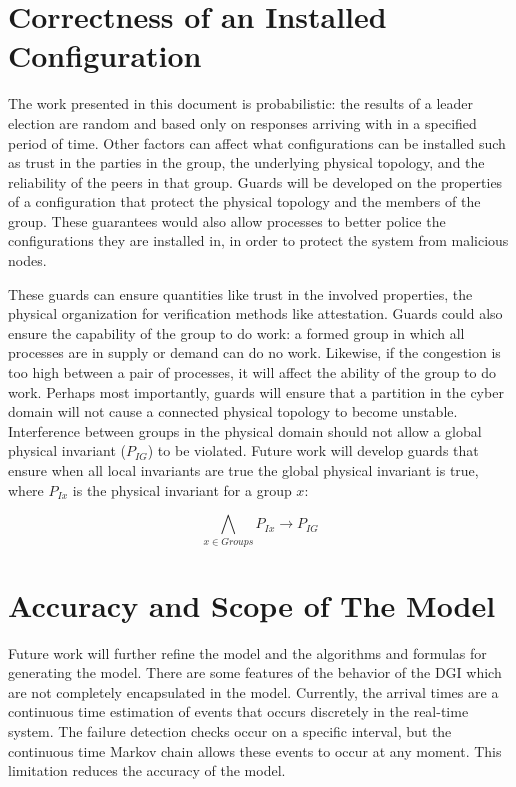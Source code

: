 \section{Correctness of an Installed Configuration}

The work presented in this document is probabilistic: the results of a leader election are random and based only on responses arriving with in a specified period of time.
Other factors can affect what configurations can be installed such as trust in the parties in the group, the underlying physical topology, and the reliability of the peers in that group.
Guards will be developed on the properties of a configuration that protect the physical topology and the members of the group.
These guarantees would also allow processes to better police the configurations they are installed in, in order to protect the system from malicious nodes.

These guards can ensure quantities like trust in the involved properties, the physical organization for verification methods like attestation.
Guards could also ensure the capability of the group to do work: a formed group in which all processes are in supply or demand can do no work.
Likewise, if the congestion is too high between a pair of processes, it will affect the ability of the group to do work.
Perhaps most importantly, guards will ensure that a partition in the cyber domain will not cause a connected physical topology to become unstable.
Interference between groups in the physical domain should not allow a global physical invariant ($P_{IG}$) to be violated.
Future work will develop guards that ensure when all local invariants are true the global physical invariant is true, where $P_{Ix}$ is the physical invariant for a group $x$:

\begin{equation}
\bigwedge_{x \in Groups}P_{Ix} \rightarrow P_{IG}
\end{equation}


\section{Accuracy and Scope of The Model}

Future work will further refine the model and the algorithms and formulas for generating the model.
There are some features of the behavior of the DGI which are not completely encapsulated in the model.
Currently, the arrival times are a continuous time estimation of events that occurs discretely in the real-time system.
The failure detection checks occur on a specific interval, but the continuous time Markov chain allows these events to occur at any moment.
This limitation reduces the accuracy of the model.

